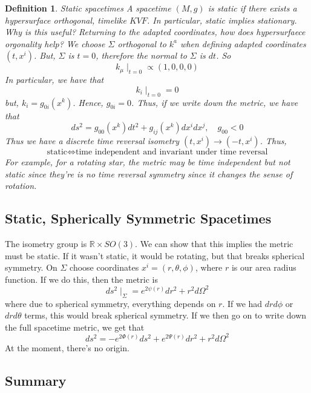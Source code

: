 \documentclass[11pt, oneside]{article}   	%
\theoremstyle{slanted}
\newtheorem*{defn}{Definition}
\begin{document}
\begin{defn}{Static spacetimes}
	A spacetime  $ \left( M , g  \right)  $ is static 
	if there exists a hypersurface orthogonal, timelike $ KVF$. 
	In particular, static implies stationary. 
	Why is this useful? Returning to the adapted coordinates, 
	how does hypersurfaece orgonality help? 
	We choose $ \Sigma $ orthogonal to $ k ^ a $ when defining 
	adapted coordinates $ \left(  t, x ^ i  \right)   $. 
	But, $ \Sigma $ is $  t = 0$, therefore the normal 
	to $ \Sigma $ is $ dt $. 
	So
	\[
		k _ \mu \mid _{ t = 0 } \propto \left( 1, 0 , 0 , 0  \right) 
	\] In particular, we have that \[
	 k _i \mid _{ t = 0 }  =0 
 \] but, $ k _ i  = g _{ 0i } \left( x ^ k  \right)  $. 
 Hence, $ g _{ 0i }  = 0$.
 Thus, if we write down the metric, 
 we have that 
 \[
	 ds ^ 2  = g _{ 00 } \left( x ^ k  \right)  dt ^ 2 + 
	 g _{ ij} \left( x ^ k  \right)  dx ^ i dx ^ j , \quad g _{ 00 } < 0 
 \] Thus we have a discrete time reversal isometry $ \left( t , x ^ i  \right)  \to 
 \left(  - t , x ^ i  \right)  $. 
 Thus,  
 \[
  \text{static} \iff \text{time independent and invariant under time reversal}
 \] For example, for a rotating star, the metric 
 may be time independent but not static since they're is no 
 time reversal symmetry since it changes the sense of rotation. 
\end{defn}

\subsection{Static, Spherically Symmetric Spacetimes}
The isometry group is $ \mathbb{ R } \times SO ( 3 )$. 
We can show that this implies the metric must be static. 
If it wasn't static, it would be rotating, but that breaks spherical symmetry. 
On $ \Sigma $ choose coordinates $ x^ i  = \left(  r, \theta , \phi   \right)  $, 
where $ r $ is our area radius function. 
If we do this, then the metric 
is 
\[
	ds ^ 2 \mid_{ \Sigma }  = e ^{ 2 \psi ( r )  } dr ^ 2 + r ^2 d \Omega ^ 2 
\]  where due to spherical symmetry, everything depends on $ r $. 
If we had $ dr d \phi $ or $ dr d \theta $ terms, 
this would break spherical symmetry. 
If we then go on to write down the full spacetime 
metric, we 
get that 
\[
	ds ^ 2   =  - e ^{ 2 \Phi ( r ) } ds ^ 2 + e ^{ 2 \Psi ( r ) } dr ^ 2 + r ^ 2 d \Omega ^ 2 
\] At the moment, there's no origin. 
\subsection*{Summary}
\end{document}
